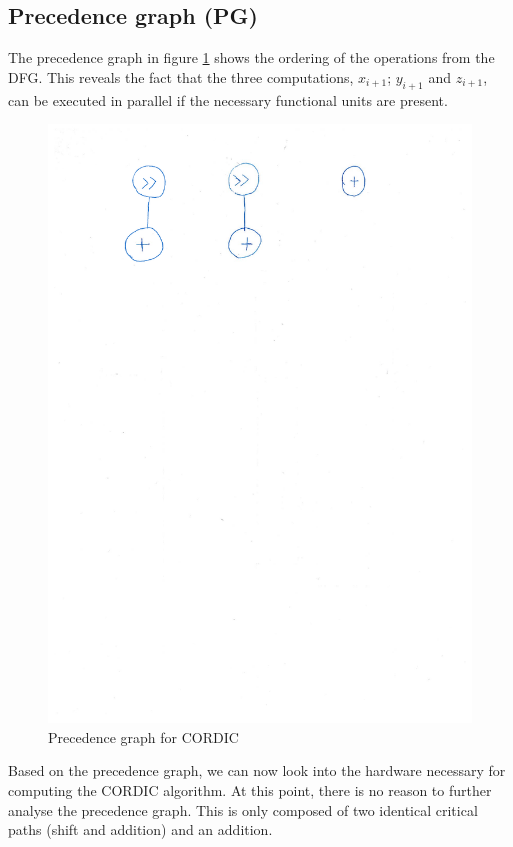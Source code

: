 \documentclass[12pt, a4paper,oneside]{article}
\begin{document}
\subsection{Precedence graph (PG)}
The precedence graph in figure \ref{fig:cordic_pg} shows the ordering of the operations
from the DFG. This reveals the fact that the three computations, $x_{i+1}$; $y_{i+1}$ and $z_{i+1}$, can be executed 
in parallel if the necessary functional units are present.

\begin{figure}[H]
	\centering
	\includegraphics[width = \linewidth,trim=0 22.9cm 0 2cm, clip]{sequencediagram.pdf}
	\caption{Precedence graph for CORDIC}
	\label{fig:cordic_pg}
\end{figure}

Based on the precedence graph, we can now look into the hardware necessary for
computing the CORDIC algorithm. At this point, there is no reason to further
analyse the precedence graph. This is only composed of two identical 
critical paths (shift and addition) and an addition.
\end{document}
